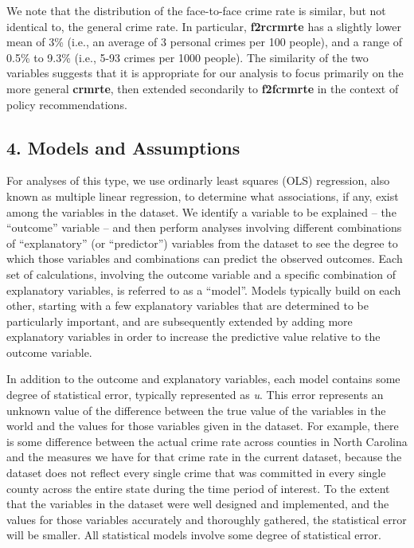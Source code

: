 \documentclass[]{article}
\begin{document}
We note that the distribution of the face-to-face crime rate is similar,
but not identical to, the general crime rate. In particular,
\textbf{f2rcrmrte} has a slightly lower mean of 3\% (i.e., an average of
3 personal crimes per 100 people), and a range of 0.5\% to 9.3\% (i.e.,
5-93 crimes per 1000 people). The similarity of the two variables
suggests that it is appropriate for our analysis to focus primarily on
the more general \textbf{crmrte}, then extended secondarily to
\textbf{f2fcrmrte} in the context of policy recommendations.

\subsection{4. Models and Assumptions}\label{models-and-assumptions}

For analyses of this type, we use ordinarly least squares (OLS)
regression, also known as multiple linear regression, to determine what
associations, if any, exist among the variables in the dataset. We
identify a variable to be explained -- the ``outcome'' variable -- and
then perform analyses involving different combinations of
``explanatory'' (or ``predictor'') variables from the dataset to see the
degree to which those variables and combinations can predict the
observed outcomes. Each set of calculations, involving the outcome
variable and a specific combination of explanatory variables, is
referred to as a ``model''. Models typically build on each other,
starting with a few explanatory variables that are determined to be
particularly important, and are subsequently extended by adding more
explanatory variables in order to increase the predictive value relative
to the outcome variable.

In addition to the outcome and explanatory variables, each model
contains some degree of statistical error, typically represented as
\emph{u}. This error represents an unknown value of the difference
between the true value of the variables in the world and the values for
those variables given in the dataset. For example, there is some
difference between the actual crime rate across counties in North
Carolina and the measures we have for that crime rate in the current
dataset, because the dataset does not reflect every single crime that
was committed in every single county across the entire state during the
time period of interest. To the extent that the variables in the dataset
were well designed and implemented, and the values for those variables
accurately and thoroughly gathered, the statistical error will be
smaller. All statistical models involve some degree of statistical
error.
\end{document}

